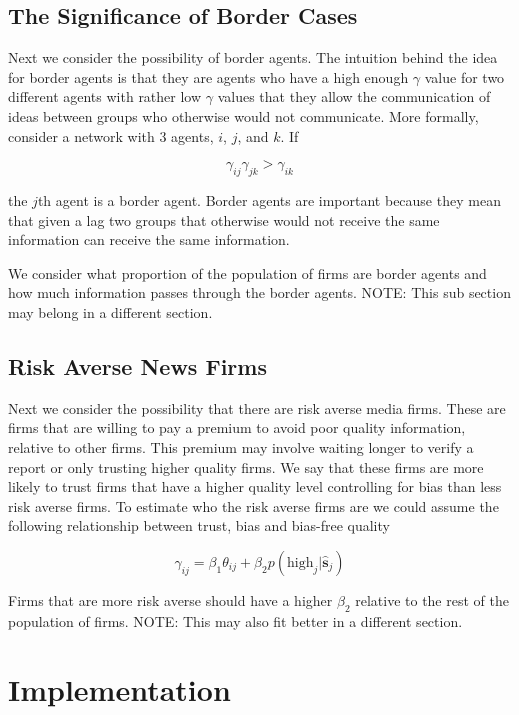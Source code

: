 \documentclass[a4paper]{article}
\begin{document}
\subsection{The Significance of Border Cases}

Next we consider the possibility of border agents.  The intuition behind the idea for border agents is that they are agents who have a high enough $\gamma$ value for two different agents with rather low $\gamma$ values that they allow the communication of ideas between groups who otherwise would not communicate.  More formally, consider a network with 3 agents, $i$, $j$, and $k$.  If

\[\gamma_{ij}\gamma_{jk} > \gamma_{ik}\]

the $j$th agent is a border agent.  Border agents are important because they mean that given a lag two groups that otherwise would not receive the same information can receive the same information.

We consider what proportion of the population of firms are border agents and how much information passes through the border agents.  NOTE: This sub section may belong in a different section.

\subsection{Risk Averse News Firms}

Next we consider the possibility that there are risk averse media firms.  These are firms that are willing to pay a premium to avoid poor quality information, relative to other firms.  This premium may involve waiting longer to verify a report or only trusting higher quality firms.  We say that these firms are more likely to trust firms that have a higher quality level controlling for bias than less risk averse firms.  To estimate who the risk averse firms are we could assume the following relationship between trust, bias and bias-free quality

\[\gamma_{ij} = \beta_1 \theta_{ij} + \beta_2 p(\text{high}_j|\hat{\textbf{s}}_j)\]

Firms that are more risk averse should have a higher $\beta_2$ relative to the rest of the population of firms. NOTE: This may also fit better in a different section.

\section{Implementation}
\end{document}
